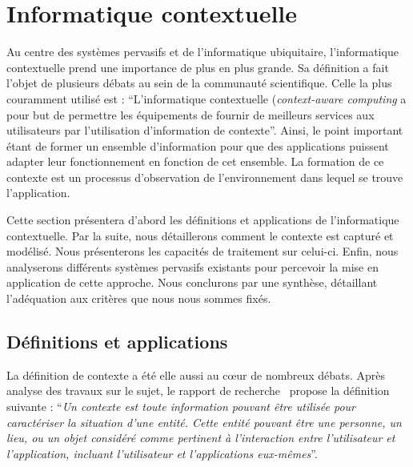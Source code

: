 \section{Informatique contextuelle}\label{sec:rw:supervision:contexte}
Au centre des systèmes pervasifs et de l'informatique ubiquitaire, l'informatique contextuelle prend une importance de plus en plus grande. Sa définition a fait l'objet de plusieurs débats au sein de la communauté scientifique. Celle la plus couramment utilisé est : \enquote{L'informatique contextuelle (\textit{context-aware computing} a pour but de permettre les équipements de fournir de meilleurs services aux utilisateurs par l'utilisation d'information de contexte}\cite{Han:contextaware}. Ainsi, le point important étant de former un ensemble d'information pour que des applications puissent adapter leur fonctionnement en fonction de cet ensemble. La formation de ce contexte est un processus d'observation de l'environnement dans lequel se trouve l'application.

Cette section présentera d'abord les définitions et applications de l'informatique contextuelle. Par la suite, nous détaillerons comment le contexte est capturé et modélisé. Nous présenterons les capacités de traitement sur celui-ci. Enfin, nous analyserons différents systèmes pervasifs existants pour percevoir la mise en application de cette approche. Nous conclurons par une synthèse, détaillant l'adéquation aux critères que nous nous sommes fixés.
\subsection{Définitions et applications}
La définition de contexte a été elle aussi au cœur de nombreux débats. Après analyse des travaux sur le sujet, le rapport de recherche~\cite{Dey:context} propose la définition suivante : \enquote{\it Un contexte est toute information pouvant être utilisée pour caractériser la situation d'une entité. Cette entité pouvant être une personne, un lieu, ou un objet considéré comme pertinent à l'interaction entre l'utilisateur et l'application, incluant l'utilisateur et l'applications eux-mêmes}.

